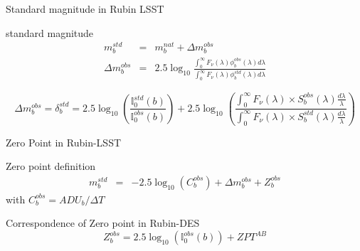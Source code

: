 \documentclass{beamer}
\begin{document}
\begin{frame}{Standard magnitude in Rubin LSST}
\begin{alertblock}{standard magnitude}
\begin{eqnarray}
m_b^{std} & = & m_b^{nat} + \Delta m_b^{obs} \\
\Delta m_b^{obs} & = & 2.5 \log_{10} \frac{\int_0^\infty F_\nu(\lambda) \phi_b^{obs}(\lambda) d\lambda}{\int_0^\infty F_\nu(\lambda) \phi_b^{std}(\lambda) d\lambda}
\end{eqnarray}
\end{alertblock}
\begin{block}{}
\begin{equation}
\Delta m_b^{obs} = \delta_b^{std} =  2.5 \log_{10}\left( \frac{\mathbb{I}_0^{std}(b)}{\mathbb{I}_0^{obs}(b)}\right) 
+ 2.5 \log_{10} 
	\left( 
	\frac{\int_0^\infty F_\nu(\lambda) \times S_b^{obs}(\lambda) \frac{d\lambda}{\lambda} }{\int_0^\infty F_\nu(\lambda) \times S_b^{std}(\lambda) \frac{d\lambda}{\lambda}} 
	\right)
\end{equation}
\end{block}
\end{frame}

\begin{frame}{Zero Point in Rubin-LSST}
\begin{exampleblock}{Zero point definition}
\begin{eqnarray}
m_b^{std} & = & -2.5 \log_{10}(C_b^{obs}) + \Delta m_b^{obs} + Z_b^{obs}
\end{eqnarray}
with $C_b^{obs} = ADU_b/\Delta T$
\end{exampleblock}
\begin{alertblock}{Correspondence of Zero point in Rubin-DES}
\begin{equation}
Z_b^{obs} = 2.5\log_{10}\left(\mathbb{I}_0^{obs}(b)\right) + ZPT^{AB}
\end{equation}
\end{alertblock}
\end{frame}
\end{document}
